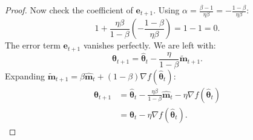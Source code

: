 \documentclass[11pt, a4paper, onecolumn, copyright, goog]{google}
\newcommand{\vect}[1]{\mathbf{#1}}
\newcommand{\vtheta}{\boldsymbol{\theta}}
\newcommand{\vm}{\vect{m}}
\newcommand{\ve}{\vect{e}}
\theoremstyle{plain}
\theoremstyle{definition}
\theoremstyle{remark}
\begin{document}
\begin{proof}
Now check the coefficient of $\ve_{t+1}$. Using $\alpha = \frac{\beta-1}{\eta \beta} = -\frac{1-\beta}{\eta \beta}$:
\begin{equation}
    1 + \frac{\eta \beta}{1-\beta} \left( -\frac{1-\beta}{\eta \beta} \right) = 1 - 1 = 0.
\end{equation}
The error term $\ve_{t+1}$ vanishes perfectly. We are left with:
\begin{equation}
    \vtheta_{t+1} = \hat{\vtheta}_t - \frac{\eta}{1-\beta} \tilde{\vm}_{t+1}.
\end{equation}
Expanding $\tilde{\vm}_{t+1} = \beta \hat{\vm}_t + (1-\beta) \nabla f(\hat{\vtheta}_t)$:
\begin{align}
    \vtheta_{t+1} &= \hat{\vtheta}_t - \frac{\eta \beta}{1-\beta} \hat{\vm}_t - \eta \nabla f(\hat{\vtheta}_t) \nonumber \\
    &= \vtheta_t - \eta \nabla f(\hat{\vtheta}_t).
\end{align}
\end{proof}
\end{document}
